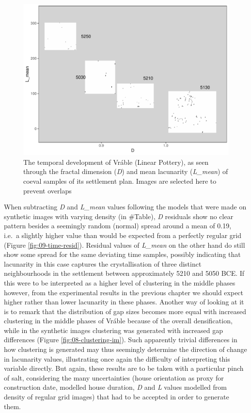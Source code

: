 \documentclass[
  12pt,
  a4paper, twoside]{book}
\begin{document}
\begin{figure}

{\centering \includegraphics[width=0.9\linewidth]{Results/fig09_time} 

}

\caption[Selected temporal samples images of Vráble, plotted by D and L\_mean estimates]{The temporal development of Vráble (Linear Pottery), as seen through the fractal dimension (\emph{D}) and mean lacunarity (\emph{L\_mean}) of coeval samples of its settlement plan. Images are selected here to prevent overlaps}\label{fig:09-time}
\end{figure}

When subtracting \emph{D} and \emph{L\_mean} values following the models that were made on synthetic images with varying density (in \#Table), \emph{D} residuals show no clear pattern besides a seemingly random (normal) spread around a mean of 0.19, i.e.~a slightly higher value than would be expected from a perfectly regular grid (Figure \ref{fig:09-time-resid}). Residual values of \emph{L\_mean} on the other hand do still show some spread for the same deviating time samples, possibly indicating that lacunarity in this case captures the crystallisation of three distinct neighbourhoods in the settlement between approximately 5210 and 5050 BCE. If this were to be interpreted as a higher level of clustering in the middle phases however, from the experimental results in the previous chapter we should expect higher rather than lower lacunarity in these phases. Another way of looking at it is to remark that the distribution of gap sizes becomes more equal with increased clustering in the middle phases of Vráble because of the overall densification, while in the synthetic images clustering was generated with increased gap differences (Figure \ref{fig:08-clustering-im}). Such apparently trivial differences in how clustering is generated may thus seemingly determine the direction of change in lacunarity values, illustrating once again the difficulty of interpreting this variable directly. But again, these results are to be taken with a particular pinch of salt, considering the many uncertainties (house orientation as proxy for construction date, modelled house duration, \emph{D} and \emph{L} values modelled from density of regular grid images) that had to be accepted in order to generate them.
\end{document}

